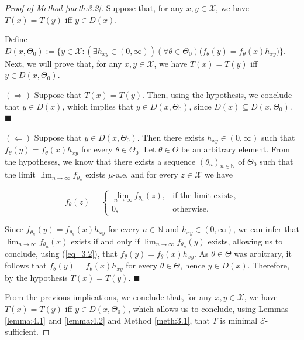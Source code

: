 \documentclass[12pt]{article}
\begin{document}
\begin{proof}[Proof of Method \ref{meth:3.2}]
Suppose that, for any $x,y\in\mathcal{X}$, we have $T(x)=T(y)$ iff $y\in D(x)$.

Define $D(x,\Theta _0):=\big\{y\in \mathcal{X}:(\exists h_{xy}\in (0,\infty ))(\forall \theta \in \Theta_0 )\big(f_\theta (y)=f_\theta (x)h_{xy}\big)\big\}$. Next, we will prove that, for any $x,y\in\mathcal{X}$, we have $T(x)=T(y)$ iff $y\in D(x,\Theta _0)$.

$(\Rightarrow )$ Suppose that $T(x)=T(y)$. Then, using the hypothesis, we conclude that $y\in D(x)$, which implies that $y\in D(x,\Theta _0)$, since $D(x)\subseteq D(x,\Theta _0)$. $\blacksquare$

$(\Leftarrow )$ Suppose that $y\in D(x,\Theta _0)$. Then there exists $h_{xy}\in (0,\infty )$ such that $f_\theta (y)=f_\theta (x)h_{xy}$ for every $\theta\in\Theta _0$. Let $\theta\in\Theta$ be an arbitrary element. From the hypotheses, we know that there exists a sequence $(\theta _n)_{n\in\mathbb{N}}$ of $\Theta _0$ such that the limit $\lim_{n\to\infty}f_{\theta_n}$ exists $\mu$-a.e. and for every $z\in\mathcal{X}$ we have 

\begin{equation}
\label{eq_3.2}
f_\theta (z)=\begin{cases}\lim_{n\to \infty}f_{\theta _n}(z),&\text{if the limit exists,}\\0,&\text{otherwise}.\end{cases}
\end{equation}


Since $f_{\theta_n}(y)=f_{\theta_n}(x)h_{xy}$ for every $n\in\mathbb{N}$ and $h_{xy}\in(0,\infty)$, we can infer that $\lim_{n\to\infty}f_{\theta_n}(x)$ exists if and only if $\lim_{n\to\infty}f_{\theta_n}(y)$ exists, allowing us to conclude, using (\ref{eq_3.2}), that $f_\theta(y)=f_\theta(x)h_{xy}$. As $\theta\in\Theta$ was arbitrary, it follows that $f_\theta(y)=f_\theta(x)h_{xy}$ for every $\theta\in\Theta$, hence $y\in D(x)$. Therefore, by the hypothesis $T(x)=T(y)$.
$\blacksquare$

From the previous implications, we conclude that, for any $x,y\in\mathcal{X}$, we have $T(x)=T(y)$ iff $y\in D(x,\Theta _0)$, which allows us to conclude, using Lemmas \ref{lemma:4.1} and \ref{lemma:4.2} and Method \ref{meth:3.1}, that $T$ is minimal $\mathcal{E}$-sufficient.
\end{proof}
\end{document}
